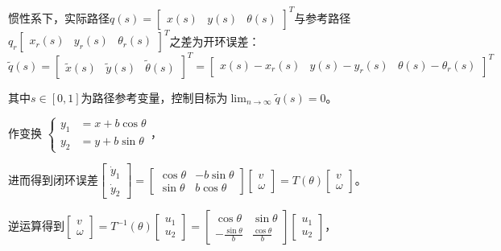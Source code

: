 \documentclass[
12pt, %
a4paper, 
oneside, %
headinclude,footinclude, %
]{scrartcl}
\begin{document}
惯性系下，实际路径$ q(s) = \begin{bmatrix} x(s) & y(s) & \theta(s) \end{bmatrix}^T $与参考路径$ q_r \begin{bmatrix} x_r(s) & y_r(s) & \theta_r(s) \end{bmatrix}^T $之差为开环误差：
$$ \tilde{q}(s) = \begin{bmatrix} \tilde{x}(s) & \tilde{y}(s) & \tilde{\theta}(s) \end{bmatrix}^T = \begin{bmatrix} x(s) - x_r(s) & y(s) - y_r(s) & \theta(s) - \theta_r(s) \end{bmatrix}^T $$

其中$ s \in [0,1] $为路径参考变量，控制目标为$ \lim_{n \to \infty} \tilde{q}(s) = 0 $。

作变换
$
\begin{cases}
y_1 &= x + b\cos\theta \\
y_2 &= y + b\sin\theta
\end{cases}
$，

进而得到闭环误差$ \begin{bmatrix} \dot{y}_1 \\ \dot{y}_2 \end{bmatrix} = \begin{bmatrix} \cos\theta & -b\sin\theta \\ \sin\theta & b\cos\theta \end{bmatrix} \begin{bmatrix} v \\ \omega \end{bmatrix} = T(\theta) \begin{bmatrix} v \\ \omega \end{bmatrix} $。

逆运算得到$ \begin{bmatrix} v \\ \omega \end{bmatrix} = T^{-1}(\theta) \begin{bmatrix} u_1 \\ u_2 \end{bmatrix} = \begin{bmatrix} \cos\theta & \sin\theta \\ -\frac{\sin\theta}{b} & \frac{\cos\theta}{b} \end{bmatrix} \begin{bmatrix} u_1 \\ u_2 \end{bmatrix} $，
\end{document}
